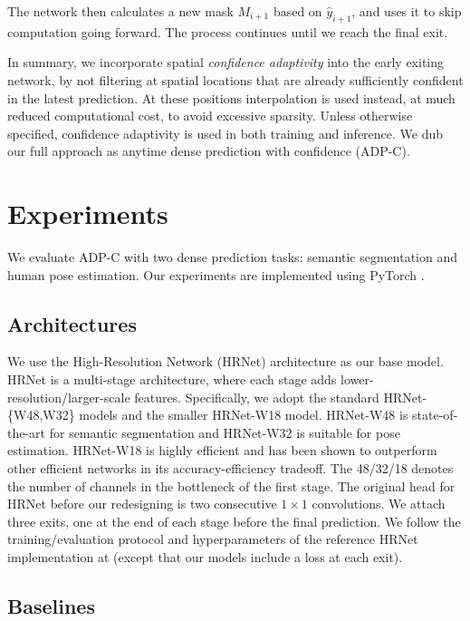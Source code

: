 The network then calculates a new mask $M_{i+1}$ based on $\hat{y}_{i+1}$, and uses it to skip computation going forward.
The process continues until we reach the final exit.

In summary, we incorporate spatial \emph{confidence adaptivity} into the early exiting network, by not filtering at spatial locations that are already sufficiently confident in the latest prediction.
At these positions interpolation is used instead, at much reduced computational cost, to avoid excessive sparsity.
Unless otherwise specified, confidence adaptivity is used in both training and inference. We dub our full approach as anytime dense prediction with confidence (ADP-C).

\section{Experiments}
We evaluate ADP-C with two dense prediction tasks: semantic segmentation and human pose estimation.
Our experiments are implemented using PyTorch \cite{pytorch}. 


\subsection{Architectures}
We use the High-Resolution Network (HRNet) \cite{wang2020deep} architecture as our base model. HRNet is a multi-stage architecture, where each stage adds lower-resolution/larger-scale features.
Specifically, we adopt the standard HRNet-\{W48,W32\} models and the smaller HRNet-W18 model.
HRNet-W48 is state-of-the-art for semantic segmentation and HRNet-W32 is suitable for pose estimation.
HRNet-W18 is highly efficient and has been shown to outperform other efficient networks \cite{zhao2018icnet,Sandler2018} in its accuracy-efficiency tradeoff. 
The 48/32/18 denotes the number of channels in the bottleneck of the first stage. The original head for HRNet before our redesigning is two consecutive $1\times1$ convolutions.
We attach three exits, 
one at the end of each stage before the final prediction.
We follow the training/evaluation protocol and hyperparameters of the reference HRNet implementation at \cite{sun2019deep,wang2020deep} (except that our models include a loss at each exit).

\subsection{Baselines}
